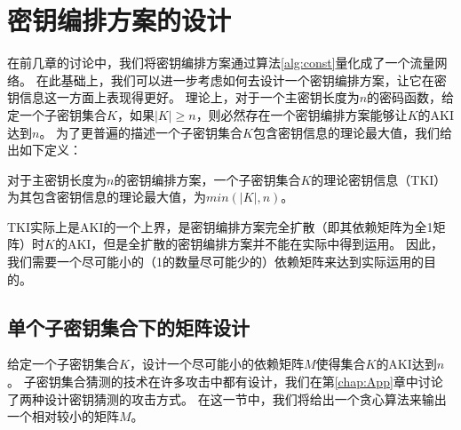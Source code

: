 
\chapter{密钥编排方案的设计}
\label{chap:Design}
在前几章的讨论中，我们将密钥编排方案通过算法\ref{alg:const}量化成了一个流量网络。
在此基础上，我们可以进一步考虑如何去设计一个密钥编排方案，让它在密钥信息这一方面上表现得更好。
理论上，对于一个主密钥长度为$n$的密码函数，给定一个子密钥集合$K$，如果$|K|\geq n$，则必然存在一个密钥编排方案能够让$K$的AKI达到$n$。
为了更普遍的描述一个子密钥集合$K$包含密钥信息的理论最大值，我们给出如下定义：
\begin{defn}
    对于主密钥长度为$n$的密钥编排方案，一个子密钥集合$K$的理论密钥信息（TKI）为其包含密钥信息的理论最大值，为$min(|K|,n)$。
\end{defn}
TKI实际上是AKI的一个上界，是密钥编排方案完全扩散（即其依赖矩阵为全1矩阵）时$K$的AKI，但是全扩散的密钥编排方案并不能在实际中得到运用。
因此，我们需要一个尽可能小的（1的数量尽可能少的）依赖矩阵来达到实际运用的目的。

\section{单个子密钥集合下的矩阵设计}
给定一个子密钥集合$K$，设计一个尽可能小的依赖矩阵$M$使得集合$K$的AKI达到$n$。
子密钥集合猜测的技术在许多攻击中都有设计，我们在第\ref{chap:App}章中讨论了两种设计密钥猜测的攻击方式。
在这一节中，我们将给出一个贪心算法来输出一个相对较小的矩阵$M$。

